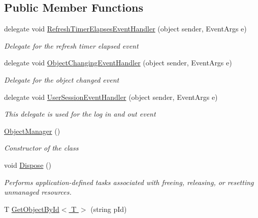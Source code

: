 \subsection*{Public Member Functions}
\begin{DoxyCompactItemize}
\item 
delegate void \hyperlink{class_plex_byte_1_1_mo_cap_1_1_managers_1_1_object_manager_a47b52df5c51e0f9e7200716fa0235e51}{Refresh\+Timer\+Elapses\+Event\+Handler} (object sender, Event\+Args e)
\begin{DoxyCompactList}\small\item\em Delegate for the refresh timer elapsed event \end{DoxyCompactList}\item 
delegate void \hyperlink{class_plex_byte_1_1_mo_cap_1_1_managers_1_1_object_manager_a0ba242dc52a4fcf291b73aeb36dbc51f}{Object\+Changing\+Event\+Handler} (object sender, Event\+Args e)
\begin{DoxyCompactList}\small\item\em Delegate for the object changed event \end{DoxyCompactList}\item 
delegate void \hyperlink{class_plex_byte_1_1_mo_cap_1_1_managers_1_1_object_manager_a16a70a9ab581238824804eeb45de48b8}{User\+Session\+Event\+Handler} (object sender, Event\+Args e)
\begin{DoxyCompactList}\small\item\em This delegate is used for the log in and out event \end{DoxyCompactList}\item 
\hyperlink{class_plex_byte_1_1_mo_cap_1_1_managers_1_1_object_manager_ae41b9c8cbf57db117d9f4b0298d12435}{Object\+Manager} ()
\begin{DoxyCompactList}\small\item\em Constructor of the class \end{DoxyCompactList}\item 
void \hyperlink{class_plex_byte_1_1_mo_cap_1_1_managers_1_1_object_manager_a77a32ed0738cd2cf3b4f66d30a418d02}{Dispose} ()
\begin{DoxyCompactList}\small\item\em Performs application-\/defined tasks associated with freeing, releasing, or resetting unmanaged resources. \end{DoxyCompactList}\item 
T \hyperlink{class_plex_byte_1_1_mo_cap_1_1_managers_1_1_object_manager_af589ecbef38de0973c7ac3d00a3c99e6}{Get\+Object\+By\+Id$<$ T $>$} (string p\+Id)

\end{DoxyCompactItemize}
